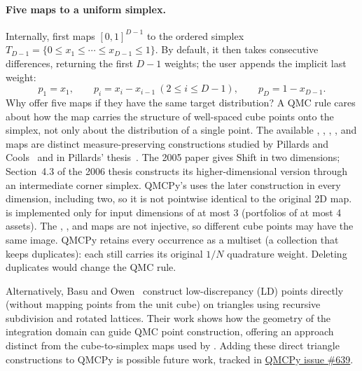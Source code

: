 \paragraph{Five maps to a uniform simplex.}
Internally,  first maps $[0,1]^{D-1}$ to the ordered simplex
$T_{D-1}=\{0\leq x_1\leq\cdots\leq x_{D-1}\leq1\}$.  By default, it then
takes consecutive differences, returning the first $D-1$ weights; the user
appends the implicit last weight:
\[
p_1=x_1,\qquad p_i=x_i-x_{i-1}\ (2\leq i\leq D-1),\qquad
p_D=1-x_{D-1}.
\]
Why offer five maps if they have the same target distribution?  A QMC rule cares about how the map carries the structure of well-spaced cube points onto the simplex, not only about the distribution of a single point.  The available ,
, , , and  maps are distinct
measure-preserving constructions studied by Pillards and
Cools~\cite{pillardscools2005} and in Pillards' thesis~\cite{pillards2006}.
The 2005 paper gives Shift in two dimensions; Section~4.3 of the 2006 thesis
constructs its higher-dimensional version through an intermediate corner
simplex.  QMCPy's  uses the later construction in every dimension,
including two, so it is not pointwise identical to the original 2D map.
 is
implemented only for input dimensions of at most 3 (portfolios of at most
4 assets).
The , , and  maps are not injective, so
different cube points may have the same image.  QMCPy retains every occurrence
as a multiset (a collection that keeps duplicates): each still carries its
original $1/N$ quadrature weight.
Deleting duplicates would change the QMC rule.

Alternatively, Basu and Owen~\cite{basuowen2015} construct low-discrepancy
(LD) points directly (without mapping points from the unit cube) on triangles using recursive subdivision and rotated
lattices.  Their work shows how the geometry of the integration domain can
guide QMC point construction, offering an approach distinct from the
cube-to-simplex maps used by .  Adding these direct
triangle constructions to QMCPy is possible future work, tracked in
\href{https://github.com/QMCSoftware/qmcpy/issues/639}{QMCPy issue \#639}.

